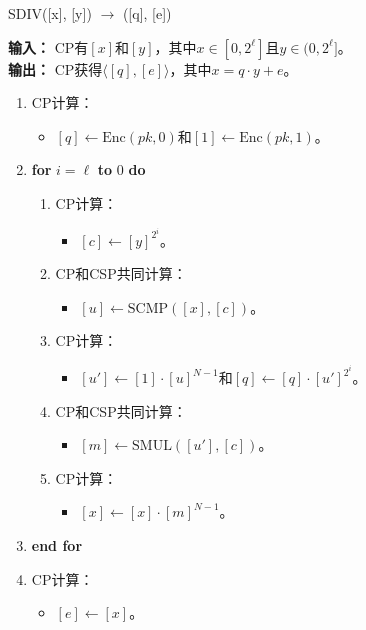 \begin{algorithm}
\caption{SDIV([x], [y]) \(\rightarrow\) ([q], [e])}
\textbf{输入：} CP有\([x]\)和\([y]\)，其中\(x \in [0, 2^\ell]\)且\(y \in (0, 2^\ell]\)。\\
\textbf{输出：} CP获得\(\langle [q], [e]\rangle\)，其中\(x = q \cdot y + e\)。
\begin{enumerate}
    \item CP计算：
    \begin{itemize}
        \item \([q] \leftarrow \text{Enc}(pk, 0)\)和\([1] \leftarrow \text{Enc}(pk, 1)\)。
    \end{itemize}
    \item \textbf{for} \(i = \ell\) \textbf{to} 0 \textbf{do}
    \begin{enumerate}
        \item CP计算：
        \begin{itemize}
            \item \([c] \leftarrow [y]^{2^i}\)。
        \end{itemize}
        \item CP和CSP共同计算：
        \begin{itemize}
            \item \([u] \leftarrow \text{SCMP}([x], [c])\)。
        \end{itemize}
        \item CP计算：
        \begin{itemize}
            \item \([u'] \leftarrow [1] \cdot [u]^{N-1}\)和\([q] \leftarrow [q] \cdot [u']^{2^i}\)。
        \end{itemize}
        \item CP和CSP共同计算：
        \begin{itemize}
            \item \([m] \leftarrow \text{SMUL}([u'], [c])\)。
        \end{itemize}
        \item CP计算：
        \begin{itemize}
            \item \([x] \leftarrow [x] \cdot [m]^{N-1}\)。
        \end{itemize}
    \end{enumerate}
    \item \textbf{end for}
    \item CP计算：
    \begin{itemize}
        \item \([e] \leftarrow [x]\)。
    \end{itemize}
\end{enumerate}
\end{algorithm}

